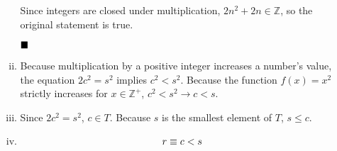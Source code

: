 \documentclass{article}
\newcommand{\Z}{\mathbb{Z}}
\newcommand{\qed}{\hfill\blacksquare}
\begin{document}
\begin{enumerate}
\begin{enumerate}[(i)]
		            Since integers are closed under multiplication, $2n^2 + 2n \in \Z$,
		            so the original statement is true.

		            $\qed$

		      \item Because multiplication by a positive integer increases a number's
		            value, the equation $2c^2 = s^2$ implies $c^2 < s^2$.
		            Because the function $f(x) = x^2$ strictly increases for
		            $x \in \Z^+$, $c^2 < s^2 \to c < s$.

		      \item Since $2c^2 = s^2$, $c \in T$. Because $s$ is the smallest element of
		            $T$, $s \le c$.

		      \item $$
			            r  \equiv c < s \\
		            $$
	      \end{enumerate}
\end{enumerate}
\end{document}
